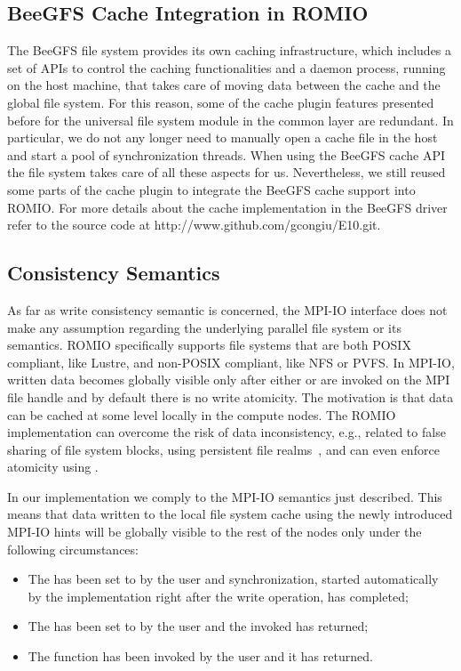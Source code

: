 \subsection{BeeGFS Cache Integration in ROMIO}
The BeeGFS file system provides its own caching infrastructure, which includes a set of APIs to control the caching functionalities and a daemon process, running on the host machine, that takes care of 
moving data between the cache and the global file system. For this reason, some of the cache plugin features presented before for the universal file system module in the common layer are redundant. In 
particular, we do not any longer need to manually open a cache file in the host and start a pool of synchronization threads. When using the BeeGFS cache API the file system takes care of all these aspects 
for us. Nevertheless, we still reused some parts of the cache plugin to integrate the BeeGFS cache support into ROMIO. For more details about the cache implementation in the BeeGFS driver refer to the
source code at http://www.github.com/gcongiu/E10.git.

\subsection{Consistency Semantics}
As far as write consistency semantic is concerned, the MPI-IO interface does not make any assumption regarding the underlying parallel file system or its semantics. ROMIO specifically supports file systems that are 
both POSIX compliant, like Lustre, and non-POSIX compliant, like NFS or PVFS. In MPI-IO, written data becomes globally visible only after either  or  
are invoked on the MPI file handle and by default there is no write atomicity. The motivation is that data can be cached at some level locally in the compute nodes. The ROMIO implementation can overcome the 
risk of data inconsistency, e.g., related to false sharing of file system blocks, using persistent file realms~\cite{ColomaCWWRP04}, and can even enforce atomicity using .

In our implementation we comply to the MPI-IO semantics just described. This means that data written to the local file system cache using the newly introduced MPI-IO hints will be globally visible to the rest 
of the nodes only under the following circumstances:

\begin{itemize}
\item The  has been set to  by the user and synchronization, started automatically by the implementation right after the write operation, has completed;
\item The  has been set to  by the user and the invoked  has returned;
\item The  function has been invoked by the user and it has returned.
\end{itemize}

